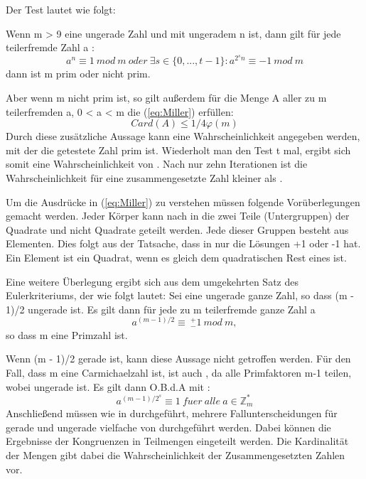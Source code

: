 		 Der Test lautet wie folgt:
		 
		 Wenn m \myin {} > 9  eine ungerade Zahl und  mit ungeradem n ist, dann gilt für jede teilerfremde Zahl a \myin {}:		 
	 	\begin{equation} \label{eq:Miller}
			a^n \equiv 1~mod~m~oder~\exists s \in \{0,..., t - 1\} : a^{2^sn} \equiv -1~mod~m
		\end{equation}
		dann ist m prim oder nicht prim.
		
		Aber wenn m nicht prim ist, so gilt außerdem für die Menge A aller zu m teilerfremden a, 0 < a < m die (\ref{eq:Miller}) erfüllen:
	 	\begin{displaymath}
		 	Card(A) \leq 1/4 \varphi(m)
	 	\end{displaymath}
	 	Durch diese zusätzliche Aussage kann eine Wahrscheinlichkeit angegeben werden, mit der die getestete Zahl prim ist. Wiederholt man den Test t mal, ergibt sich somit eine Wahrscheinlichkeit von . Nach nur zehn Iterationen ist die Wahrscheinlichkeit für eine zusammengesetzte Zahl kleiner als .
	 	
	 	Um die Ausdrücke in (\ref{eq:Miller}) zu verstehen müssen folgende Vorüberlegungen gemacht werden.
	 	Jeder Körper  kann nach \cite{Algorithmische:Zahlentheorie} in die zwei Teile (Untergruppen) der Quadrate und nicht Quadrate geteilt werden. Jede dieser Gruppen besteht aus  Elementen. Dies folgt aus der Tatsache, dass  in  nur die Lösungen +1 oder -1 hat. Ein Element ist ein Quadrat, wenn es gleich dem quadratischen Rest eines  ist.
	 	
	 	Eine weitere Überlegung ergibt sich aus dem umgekehrten Satz des Eulerkriteriums, der wie folgt lautet:
	 	Sei  eine ungerade ganze Zahl, so dass (m - 1)/2 ungerade ist.
	 	Es gilt dann für jede zu m teilerfremde ganze Zahl a
	 	\begin{displaymath}
		 	a^{(m-1)/2} \equiv~^+_-1~mod~m,
	 	\end{displaymath}
	 	so dass m eine Primzahl ist.
	 	
	 	Wenn (m - 1)/2 gerade ist, kann diese Aussage nicht getroffen werden. Für den Fall, dass m eine Carmichaelzahl ist, ist auch  , da alle Primfaktoren m-1 teilen, wobei  ungerade ist. Es gilt dann O.B.d.A mit :
 		\begin{displaymath}
	 		a^{(m-1)/2^s} \equiv1 ~fuer~alle~a \in \mathbb{Z}^*_m
 		\end{displaymath}
 		Anschließend müssen wie in \cite{Algorithmische:Zahlentheorie} durchgeführt, mehrere Fallunterscheidungen für gerade und ungerade vielfache von  durchgeführt werden. Dabei können die Ergebnisse der Kongruenzen in Teilmengen eingeteilt werden. Die Kardinalität der Mengen gibt dabei die Wahrscheinlichkeit der Zusammengesetzten Zahlen vor.
 		
